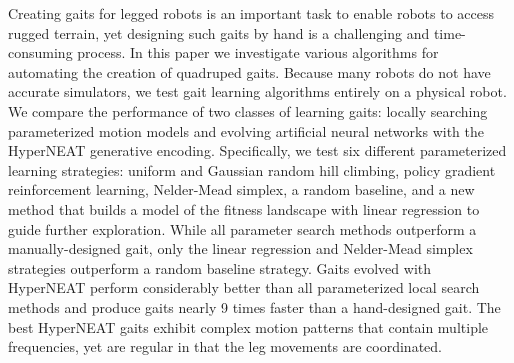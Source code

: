 Creating gaits for legged robots is an important task to enable robots
to access rugged terrain, yet designing such gaits by hand is a
challenging and time-consuming process. In this paper we investigate
various algorithms for automating the creation of quadruped
gaits. Because many robots do not have accurate simulators, we test
gait learning algorithms entirely on a physical robot.  We compare the
performance of two classes of learning gaits: locally searching
parameterized motion models and evolving artificial neural networks
with the HyperNEAT generative encoding. Specifically, we test six
different parameterized learning strategies: uniform and Gaussian
random hill climbing, policy gradient reinforcement learning,
Nelder-Mead simplex, a random baseline, and a new method that builds a
model of the fitness landscape with linear regression to guide further
exploration.  While all parameter search methods outperform a
manually-designed gait, only the linear regression and Nelder-Mead
simplex strategies outperform a random baseline strategy. Gaits
evolved with HyperNEAT perform considerably better than all
parameterized local search methods and produce gaits nearly 9 times faster than a hand-designed gait.  The best HyperNEAT gaits exhibit
complex motion patterns that contain multiple frequencies, yet are
regular in that the leg movements are coordinated.


